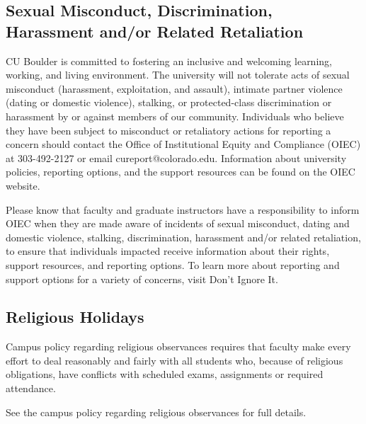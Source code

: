 \documentclass[9pt]{article}
\begin{document}
{\subsection*{Sexual Misconduct, Discrimination, Harassment and/or Related Retaliation}
CU Boulder is committed to fostering an inclusive and welcoming learning, working, and living environment. The university will not tolerate acts of sexual misconduct (harassment, exploitation, and assault), intimate partner violence (dating or domestic violence), stalking, or protected-class discrimination or harassment by or against members of our community. Individuals who believe they have been subject to misconduct or retaliatory actions for reporting a concern should contact the Office of Institutional Equity and Compliance (OIEC) at 303-492-2127 or email cureport@colorado.edu. Information about university policies, reporting options, and the support resources can be found on the OIEC website.

Please know that faculty and graduate instructors have a responsibility to inform OIEC when they are made aware of incidents of sexual misconduct, dating and domestic violence, stalking, discrimination, harassment and/or related retaliation, to ensure that individuals impacted receive information about their rights, support resources, and reporting options. To learn more about reporting and support options for a variety of concerns, visit Don’t Ignore It.

 
\subsection*{Religious Holidays}
Campus policy regarding religious observances requires that faculty make every effort to deal reasonably and fairly with all students who, because of religious obligations, have conflicts with scheduled exams, assignments or required attendance.

See the campus policy regarding religious observances for full details.
}
\end{document}
